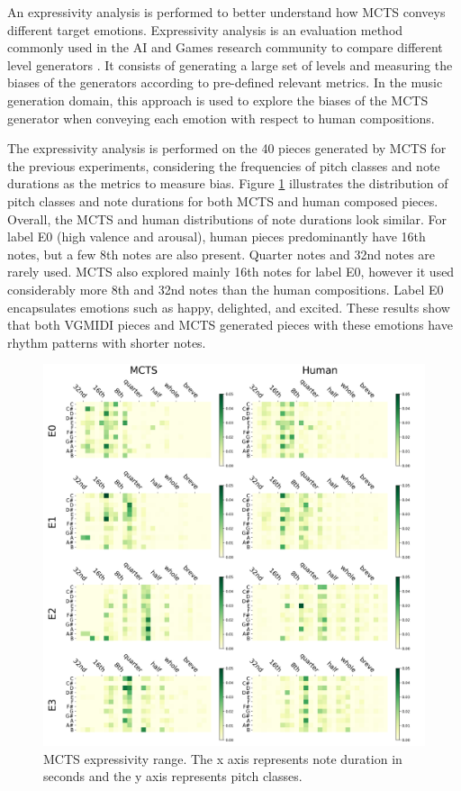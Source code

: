 An expressivity analysis is performed to better understand how MCTS conveys different target emotions. Expressivity analysis is an evaluation method commonly used in the AI and Games research community to compare different level generators \cite{smith2010analyzing}.  It consists of generating a large set of levels and measuring the biases of the generators according to pre-defined relevant metrics. In the music generation domain, this approach is used to explore the biases of the MCTS generator when conveying each emotion with respect to human compositions.

The expressivity analysis is performed on the 40 pieces generated by MCTS for the previous experiments, considering the frequencies of pitch classes and note durations as the metrics to measure bias. Figure \ref{fig:expressivity} illustrates the distribution of pitch classes and note durations for both MCTS and human composed pieces. Overall, the MCTS and human distributions of note durations look similar. For label E0 (high valence and arousal), human pieces predominantly have 16th notes, but a few 8th notes are also present. Quarter notes and 32nd notes are rarely used. MCTS also explored mainly 16th notes for label E0, however it used considerably more 8th and 32nd notes than the human compositions. Label E0 encapsulates emotions such as happy, delighted, and excited. These results show that both VGMIDI pieces and MCTS generated pieces with these emotions have rhythm patterns with shorter notes.

\begin{figure}[h]
\centering
 \includegraphics[width=0.8\columnwidth]{imgs/ismir21/mcts_human.png}
   \caption{MCTS expressivity range. The x axis represents note duration in seconds and the y axis represents pitch classes. }
 \label{fig:expressivity}
\end{figure}


